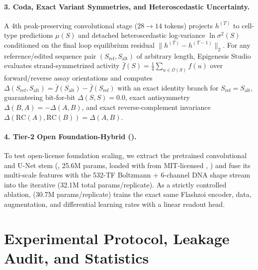 \documentclass[10.5pt,a4paper]{article}
\begin{document}
\paragraph{3. Coda, Exact Variant Symmetries, and Heteroscedastic Uncertainty.}
A 4th peak-preserving convolutional stage ($28\to 14$ tokens) projects $h^{(T)}$ to cell-type predictions $\mu(S)$ and detached heteroscedastic log-variance $\ln\sigma^2(S)$ conditioned on the final loop equilibrium residual $\|h^{(T)}-h^{(T-1)}\|_2$. For any reference/edited sequence pair $(S_{\text{ref}}, S_{\text{alt}})$ of arbitrary length, Epigenesis Studio evaluates strand-symmetrized activity $\bar{f}(S)=\tfrac{1}{4}\sum_{u\in\mathcal{O}(S)} f(u)$ over forward/reverse assay orientations and computes $\Delta(S_{\text{ref}}, S_{\text{alt}}) = \bar{f}(S_{\text{alt}}) - \bar{f}(S_{\text{ref}})$ with an exact identity branch for $S_{\text{ref}}=S_{\text{alt}}$, guaranteeing bit-for-bit $\Delta(S,S)=0.0$, exact antisymmetry $\Delta(B,A)=-\Delta(A,B)$, and exact reverse-complement invariance $\Delta(\text{RC}(A),\text{RC}(B))=\Delta(A,B)$.

\paragraph{4. Tier-2 Open Foundation-Hybrid ().}
To test open-license foundation scaling, we extract the pretrained convolutional and U-Net stem (, 25.6M params, loaded with  from MIT-licensed , \citealp{hingerl2025}) and fuse its multi-scale features with the 532-TF Boltzmann + 6-channel DNA shape stream into the iterative  (32.1M total params/replicate). As a strictly controlled ablation,  (30.7M params/replicate) trains the exact same Flashzoi encoder, data, augmentation, and differential learning rates with a linear readout head.

\section{Experimental Protocol, Leakage Audit, and Statistics}
\end{document}
